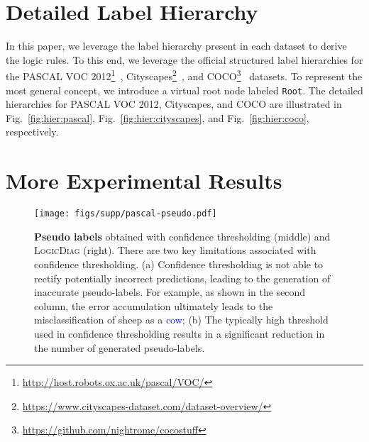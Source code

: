 \documentclass[10pt,twocolumn,letterpaper]{article}
\def\Ours{{\textsc{LogicDiag}}}
\begin{document}
\section{Detailed Label Hierarchy}\label{sec:hier}

In this paper, we leverage the label hierarchy present in each dataset to derive the logic rules. 
To this end, we leverage the official structured label hierarchies for the PASCAL VOC 2012\footnote{\url{http://host.robots.ox.ac.uk/pascal/VOC/}}~\cite{everingham2015pascal}, Cityscapes\footnote{\url{https://www.cityscapes-dataset.com/dataset-overview/}}~\cite{cordts2016cityscapes}, and COCO\footnote{\url{https://github.com/nightrome/cocostuff}}~\cite{lin2014microsoft} datasets.
To represent the most general concept, we introduce a virtual root node labeled \texttt{Root}. The detailed hierarchies for PASCAL VOC 2012, Cityscapes, and COCO are illustrated in Fig.~\ref{fig:hier:pascal}, Fig.~\ref{fig:hier:cityscapes}, and Fig.~\ref{fig:hier:coco}, respectively.




\section{More Experimental Results}\label{sec:exp}


\begin{figure}[t]
   \begin{center}
      \texttt{[image: figs/supp/pascal-pseudo.pdf]}
  \end{center}
  
  \vspace{-10pt}
  \captionsetup{font=small}
  \caption{\small \textbf{Pseudo labels} obtained with confidence thresholding (middle) and {\Ours} (right). There are two key limitations associated with confidence thresholding. 
  (a) Confidence thresholding is not able to rectify potentially incorrect predictions, leading to the generation of inaccurate pseudo-labels. For example, as shown in the second column, the error accumulation ultimately leads to the misclassification of \textcolor{sheep}{sheep} as a \textcolor{blue}{cow}; 
  (b) The typically high threshold used in confidence thresholding results in a significant reduction in the number of generated pseudo-labels.}
  \label{fig:quality}
\end{figure}
\end{document}
